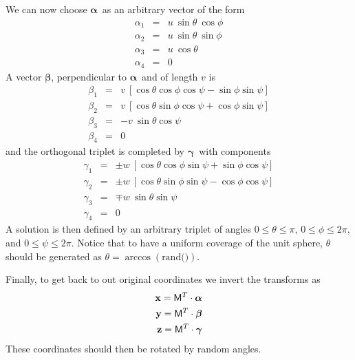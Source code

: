 \documentclass[12pt] {article}
\def\bal{{\ifmmode \boldsymbol{\alpha} \else $\boldsymbol{\alpha}$\fi}}
\def\bbe{{\ifmmode \boldsymbol{\beta } \else $\boldsymbol{\beta }$\fi}}
\def\bga{{\ifmmode \boldsymbol{\gamma} \else
   $\boldsymbol{\gamma}$\fi}}
\begin{document}
We can now choose \bal\ as an arbitrary vector of the form
\begin{eqnarray}
\alpha_1 &=& u \>\sin\theta\>\cos\phi \\
\alpha_2 &=& u \>\sin\theta\>\sin\phi \\
\alpha_3 &=& u \>\cos\theta \\
\alpha_4 &=& 0
\end{eqnarray}
A vector \bbe, perpendicular to \bal\ and of length $v$ is
\begin{eqnarray}
\beta_1 &=& v \>[\cos\theta\cos\phi\cos\psi - \sin\phi\sin\psi] \\
\beta_2 &=& v \>[\cos\theta\sin\phi \cos\psi + \cos\phi\sin\psi] \\
\beta_3 &=& -v \>\sin\theta \cos\psi \\
\beta_4 &=& 0
\end{eqnarray}
and the orthogonal triplet is completed by \bga\ with components
\begin{eqnarray}
\gamma_1 &=& \pm w \>[\cos\theta\cos\phi\sin\psi + \sin\phi\cos\psi] \\
\gamma_2 &=& \pm w \>[\cos\theta\sin\phi \sin\psi - \cos\phi\cos\psi] \\
\gamma_3 &=& \mp w \>\sin\theta \sin\psi \\
\gamma_4 &=& 0
\end{eqnarray}
A solution is then defined by an arbitrary triplet of angles $0 \leq
\theta \leq \pi$, $0 \leq \phi \leq 2\pi$, and  $0 \leq \psi \leq
2\pi$. Notice that to have a uniform coverage of the unit sphere,
$\theta$ should be generated as $\theta = \arccos(\text{rand()})$.


Finally, to get back to out original coordinates we invert the
transforms as
\begin{eqnarray}
{\bf x} = \mathsf{M}^T \cdot \bal\\
{\bf y} = \mathsf{M}^T \cdot \bbe\\
{\bf z} = \mathsf{M}^T \cdot \bga
\end{eqnarray}
These coordinates should then be rotated by random angles.
\end{document}
